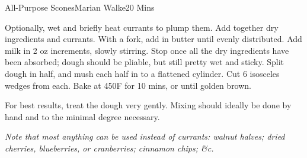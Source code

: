 \begin{recipe}{All-Purpose Scones}{Marian Walke}{20 Mins}

  Optionally, wet and briefly heat currants to plump them. Add
  together dry ingredients and currants. With a fork, add in butter
  until evenly distributed. Add milk in 2 oz increments, slowly
  stirring. Stop once all the dry ingredients have been absorbed;
  dough should be pliable, but still pretty wet and sticky. Split
  dough in half, and mush each half in to a flattened cylinder. Cut 6
  isosceles wedges from each. Bake at 450\0F for 10 mins, or until
  golden brown.
  
  For best results, treat the dough very gently.  Mixing should ideally be done by hand and to the minimal degree necessary.
\end{recipe}
\textit{Note that most anything can be used instead of currants:
  walnut halves; dried cherries, blueberries, or cranberries; cinnamon
  chips; \&c.}

